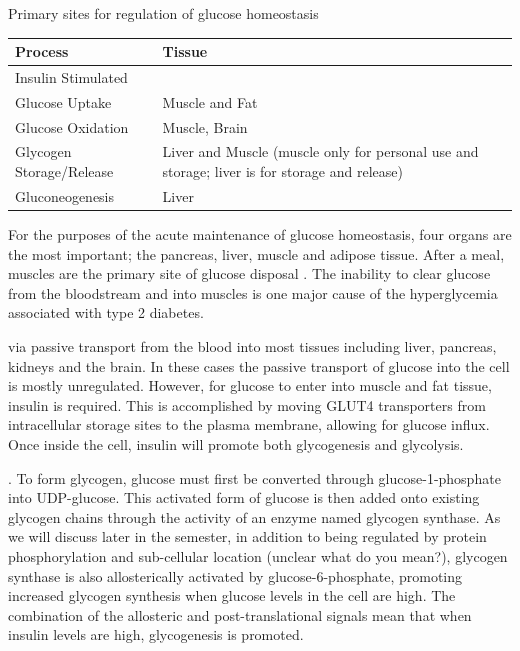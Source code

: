 \documentclass{tufte-handout}
\begin{document}
\begin{margintable}
\caption{Primary sites for regulation of glucose homeostasis}
\label{glucose-sites}
\begin{tabular}{@{}ll@{}}
\textbf{Process }                          & \textbf{Tissue}           \\ \midrule
Insulin Stimulated \\Glucose Uptake & Muscle and Fat   \\ \midrule
Glucose Oxidation & Muscle, Brain \\ \midrule
Glycogen Storage/Release                      & Liver and Muscle  (muscle only for personal use and storage; liver is for storage and release)\\ \midrule
Gluconeogenesis & Liver \\ \bottomrule
\end{tabular}
\end{margintable}

For the purposes of the acute maintenance of glucose homeostasis, four organs are the most important; the pancreas, liver, muscle and adipose tissue.  After a meal, muscles are the primary site of glucose disposal \citep{DeFronzo1981}.  The inability to clear glucose from the bloodstream and into muscles is one major cause of the hyperglycemia associated with type 2 diabetes.

 via passive transport from the blood into most tissues including liver, pancreas, kidneys and the brain.  In these cases the passive transport of glucose into the cell is mostly unregulated.  However, for glucose to enter into muscle and fat tissue, insulin is required.  This is accomplished by moving GLUT4 transporters from intracellular storage sites to the plasma membrane, allowing for glucose influx.  Once inside the cell, insulin will promote both glycogenesis and glycolysis.  

.  To form glycogen, glucose must first be converted through glucose-1-phosphate into UDP-glucose.  This activated form of glucose is then added onto existing glycogen chains through the activity of an enzyme named glycogen synthase.  As we will discuss later in the semester, in addition to being regulated by protein phosphorylation and sub-cellular location (unclear what do you mean?), glycogen synthase is also allosterically activated by glucose-6-phosphate, promoting increased glycogen synthesis when glucose levels in the cell are high.  The combination of the allosteric and post-translational signals mean that when insulin levels are high, glycogenesis is promoted.
\end{document}
